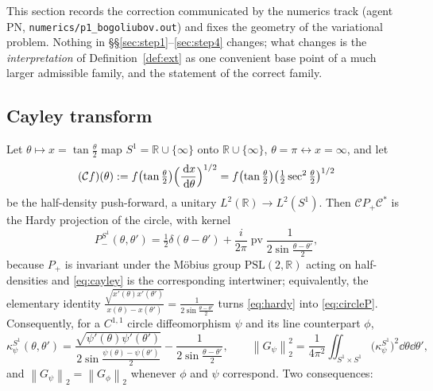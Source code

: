 \documentclass[11pt]{article}
\newcommand{\Pp}{P_+}\newcommand{\Pm}{P_-}
\newcommand{\norm}[1]{\left\lVert #1\right\rVert}\newcommand{\abs}[1]{\left|#1\right|}
\begin{document}
This section records the correction communicated by the numerics track (agent PN,
\texttt{numerics/p1\_bogoliubov.out}) and fixes the geometry of the variational problem.  Nothing in
\S\S\ref{sec:step1}--\ref{sec:step4} changes; what changes is the \emph{interpretation} of
Definition~\ref{def:ext} as one convenient base point of a much larger admissible family, and the
statement of the correct family.

\subsection{Cayley transform}
Let $\theta\mapsto x=\tan\frac\theta2$ map $S^1=\mathbb R\cup\{\infty\}$ onto $\mathbb R\cup\{\infty\}$,
$\theta=\pi\leftrightarrow x=\infty$, and let
\begin{equation}\label{eq:cayley}
 (\mathcal Cf)(\theta):=f\bigl(\tan\tfrac\theta2\bigr)\Bigl(\frac{\,\mathrm d x}{\,\mathrm d\theta}\Bigr)^{1/2}
 =f\bigl(\tan\tfrac\theta2\bigr)\bigl(\tfrac12\sec^2\tfrac\theta2\bigr)^{1/2}
\end{equation}
be the half-density push-forward, a unitary $L^2(\mathbb R)\to L^2(S^1)$.  Then
$\mathcal C\Pp\mathcal C^*$ is the Hardy projection of the circle, with kernel
\begin{equation}\label{eq:circleP}
 \Pm^{S^1}(\theta,\theta')=\tfrac12\delta(\theta-\theta')
 +\frac i{2\pi}\operatorname{pv}\frac1{2\sin\frac{\theta-\theta'}2},
\end{equation}
because $\Pp$ is invariant under the M\"obius group $\mathrm{PSL}(2,\mathbb R)$ acting on half-densities
and \eqref{eq:cayley} is the corresponding intertwiner; equivalently, the elementary identity
$\frac{\sqrt{x'(\theta)x'(\theta')}}{x(\theta)-x(\theta')}=\frac1{2\sin\frac{\theta-\theta'}2}$ turns
\eqref{eq:hardy} into \eqref{eq:circleP}.  Consequently, for a $C^{1,1}$ circle diffeomorphism $\psi$
and its line counterpart $\phi$,
\begin{equation}\label{eq:circlekernel}
 \kappa^{S^1}_\psi(\theta,\theta')
 =\frac{\sqrt{\psi'(\theta)\psi'(\theta')}}{2\sin\frac{\psi(\theta)-\psi(\theta')}2}
 -\frac1{2\sin\frac{\theta-\theta'}2},
 \qquad
 \norm{G_\psi}_2^2=\frac1{4\pi^2}\iint_{S^1\times S^1}\bigl(\kappa^{S^1}_\psi\bigr)^2
 \dd\theta\dd\theta' ,
\end{equation}
and $\norm{G_\psi}_2=\norm{G_\phi}_2$ whenever $\phi$ and $\psi$ correspond.  Two consequences:
\end{document}

